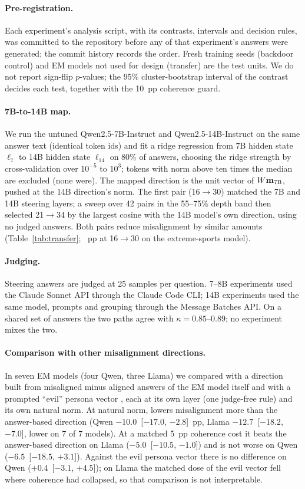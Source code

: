\paragraph{Pre-registration.} Each experiment's analysis script, with its contrasts, intervals and decision rules, was committed to the repository before any of that experiment's answers were generated; the commit history records the order. Fresh training seeds (backdoor control) and EM models not used for design (transfer) are the test units. We do not report sign-flip $p$-values; the 95\% cluster-bootstrap interval of the contrast decides each test, together with the 10~pp coherence guard.

\paragraph{7B-to-14B map.} We run the untuned Qwen2.5-7B-Instruct and Qwen2.5-14B-Instruct on the same answer text (identical token ids) and fit a ridge regression from 7B hidden state $\ell_7$ to 14B hidden state $\ell_{14}$ on 80\% of answers, choosing the ridge strength by cross-validation over $10^{-5}$ to $10^{3}$; tokens with norm above ten times the median are excluded (none were). The mapped direction is the unit vector of $W\mathbf{m}_{7\text{B}}$, pushed at the 14B direction's norm. The first pair (16$\to$30) matched the 7B and 14B steering layers; a sweep over 42 pairs in the 55--75\% depth band then selected 21$\to$34 by the largest cosine with the 14B model's own direction, using no judged answers. Both pairs reduce misalignment by similar amounts (Table~\ref{tab:transfer}; \sXspB~pp at 16$\to$30 on the extreme-sports model).

\paragraph{Judging.} Steering answers are judged at 25 samples per question. 7--8B experiments used the Claude Sonnet API through the Claude Code CLI; 14B experiments used the same model, prompts and grouping through the Message Batches API. On a shared set of answers the two paths agree with $\kappa=0.85$--$0.89$; no experiment mixes the two.

\paragraph{Comparison with other misalignment directions.} In seven EM models (four Qwen, three Llama) we compared \mdir{} with a direction built from misaligned minus aligned answers of the EM model itself \citep[as in][]{soligo2025convergent} and with a prompted ``evil'' persona vector \citep{chen2025persona}, each at its own layer (one judge-free rule) and its own natural norm. At natural norm, \mdir{} lowers misalignment more than the answer-based direction (Qwen $-10.0$~[$-17.0$, $-2.8$]~pp, Llama $-12.7$~[$-18.2$, $-7.0$], lower on 7 of 7 models). At a matched 5~pp coherence cost it beats the answer-based direction on Llama ($-5.0$~[$-10.5$, $-1.0$]) and is not worse on Qwen ($-6.5$~[$-18.5$, $+3.1$]). Against the evil persona vector there is no difference on Qwen ($+0.4$~[$-3.1$, $+4.5$]); on Llama the matched dose of the evil vector fell where coherence had collapsed, so that comparison is not interpretable.
